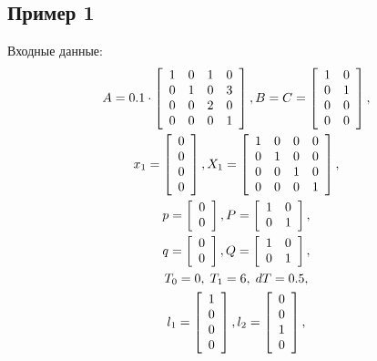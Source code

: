 \documentclass[12pt]{article}
\theoremstyle{rusdef}
\begin{document}
\subsection{Пример 1}
Входные данные:
\begin{gather}
A = 0.1 \cdot \left[
\begin{array}{cccc}
1 & 0 & 1 & 0 \\
0 & 1 & 0 & 3 \\
0 & 0 & 2 & 0 \\
0 & 0 & 0 & 1
\end{array}
\right],
B = C = \left[
\begin{array}{cc}
1 & 0 \\
0 & 1 \\
0 & 0 \\
0 & 0
\end{array}
\right], \notag \\
x_1 = \left[
\begin{array}{c}
0 \\
0 \\
0 \\
0
\end{array}
\right],
X_1 = \left[
\begin{array}{cccc}
1 & 0 & 0 & 0 \\
0 & 1 & 0 & 0 \\
0 & 0 & 1 & 0 \\
0 & 0 & 0 & 1
\end{array}
\right], \notag \\
p = \left[
\begin{array}{c}
0 \\
0
\end{array}
\right],
P = \left[
\begin{array}{cc}
1 & 0 \\
0 & 1
\end{array}
\right], \notag \\
q = \left[
\begin{array}{c}
0 \\
0
\end{array}
\right],
Q = \left[
\begin{array}{cc}
1 & 0 \\
0 & 1
\end{array}
\right], \notag \\
T_0 = 0, \; T_1 = 6, \; dT = 0.5, \notag \\
l_1 = \left[
\begin{array}{c}
1 \\
0 \\
0 \\
0
\end{array}
\right],
l_2 = \left[
\begin{array}{c}
0 \\
0 \\
1 \\
0
\end{array}
\right], \notag
\end{gather}
\end{document}
